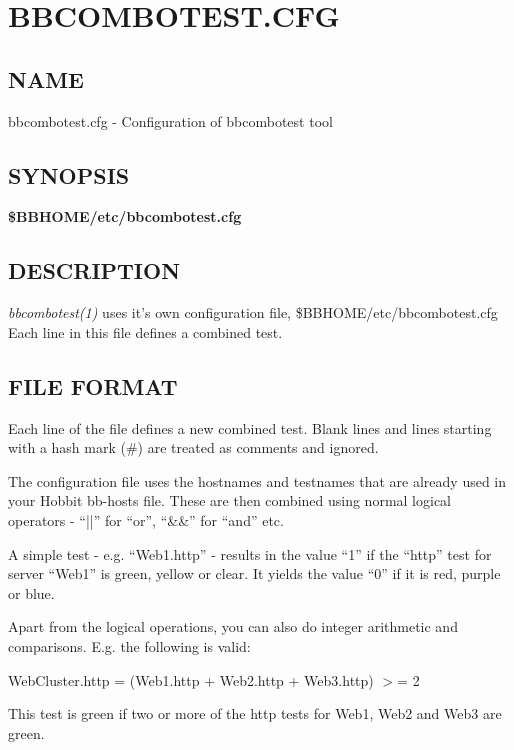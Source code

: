 %
\newpage
\section{BBCOMBOTEST.CFG}
\subsection{NAME}
 bbcombotest.cfg - Configuration of bbcombotest tool 

 
\subsection{SYNOPSIS}
\textbf{\$BBHOME/etc/bbcombotest.cfg}


 
\subsection{DESCRIPTION}
\emph{bbcombotest(1)}
 uses it's own configuration file, \$BBHOME/etc/bbcombotest.cfg Each line in this file defines a combined test. 

 
\subsection{FILE FORMAT}
 Each line of the file defines a new combined test. Blank lines and
 lines starting with a hash mark (\#) are treated as comments and
 ignored. 


  The configuration file uses the hostnames and testnames that are
  already used in your Hobbit bb-hosts file. These are then combined
  using normal logical operators - ``||'' for ``or'', ``\&\&'' for
  ``and'' etc. 



  A simple test - e.g. ``Web1.http'' - results in the value ``1'' if
  the ``http'' test for server ``Web1'' is green, yellow or clear. It
  yields the value ``0'' if it is red, purple or blue. 



  Apart from the logical operations, you can also do integer
  arithmetic and comparisons. E.g. the following is valid: 



  WebCluster.http = (Web1.http + Web2.http + Web3.http) $>$= 2 


  This test is green if two or more of the http tests for Web1, Web2 and Web3 are green. 


